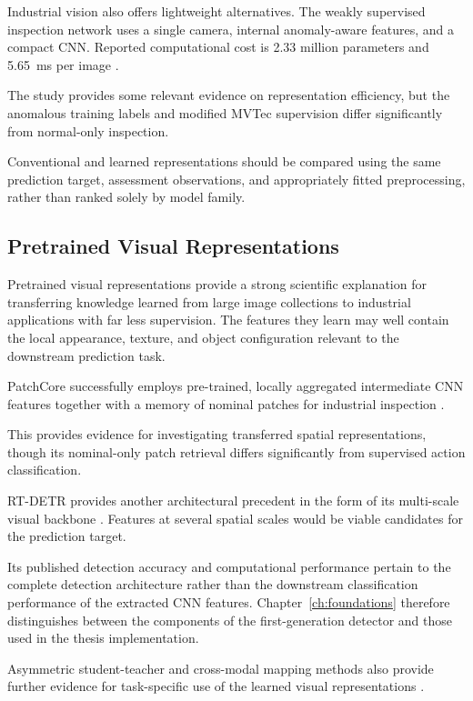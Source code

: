 Industrial vision also offers lightweight alternatives. The weakly supervised inspection network
uses a single camera, internal anomaly-aware features, and a compact CNN. Reported computational
cost is 2.33 million parameters and 5.65~ms per image \parencite[p.~6661, Table~V]{P035}.

The study provides some relevant evidence on representation efficiency, but the anomalous training
labels and modified MVTec supervision differ significantly from normal-only inspection.

Conventional and learned representations should be compared using the same prediction target,
assessment observations, and appropriately fitted preprocessing, rather than ranked solely by model
family.

\subsection{Pretrained Visual Representations}

Pretrained visual representations provide a strong scientific explanation for transferring knowledge
learned from large image collections to industrial applications with far less supervision. The
features they learn may well contain the local appearance, texture, and object configuration
relevant to the downstream prediction task.

PatchCore successfully employs pre-trained, locally aggregated intermediate CNN features together
with a memory of nominal patches for industrial inspection \parencite[Section~3]{Roth2022Towards}.

This provides evidence for investigating transferred spatial representations, though its
nominal-only patch retrieval differs significantly from supervised action classification.

RT-DETR provides another architectural precedent in the form of its multi-scale visual backbone
\parencite[Sections~4.1--4.2]{Zhao2024RTDETR}. Features at several spatial scales would be viable
candidates for the prediction target.

Its published detection accuracy and computational performance pertain to the complete detection
architecture rather than the downstream classification performance of the extracted CNN features.
Chapter~\ref{ch:foundations} therefore distinguishes between the components of the first-generation
detector and those used in the thesis implementation.

Asymmetric student-teacher and cross-modal mapping methods also provide further evidence for
task-specific use of the learned visual representations
\parencite{Rudolph2023Asymmetric,Costanzino2024Multimodal}.

